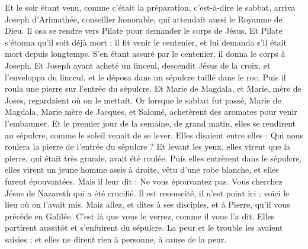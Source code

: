 \begin{multicols}{2}
Et le soir étant venu, comme c'était la préparation, c'est-à-dire le sabbat,
arriva Joseph d'Arimathée, conseiller honorable, qui attendait aussi le Royaume de Dieu. Il osa se rendre vers Pilate pour demander le corps de Jésus.
Et Pilate s'étonna qu'il soit déjà mort ; il fit venir le centenier, et lui demanda s'il était mort depuis longtemps.
S'en étant assuré par le centenier, il donna le corps à Joseph.
Et Joseph ayant acheté un linceul, descendit Jésus de la croix, et l'enveloppa du linceul, et le déposa dans un sépulcre taillé dans le roc. Puis il roula une pierre sur l'entrée du sépulcre.
Et Marie de Magdala, et Marie, mère de Joses, regardaient où on le mettait.
\VerseOne{}Or lorsque le sabbat fut passé, Marie de Magdala, Marie mère de Jacques, et Salomé, achetèrent des aromates pour venir l'embaumer.
Et le premier jour de la semaine, de grand matin, elles se rendirent au sépulcre, comme le soleil venait de se lever.
Elles disaient entre elles : Qui nous roulera la pierre de l'entrée du sépulcre ?
Et levant les yeux, elles virent que la pierre, qui était très grande, avait été roulée.
Puis elles entrèrent dans le sépulcre, elles virent un jeune homme assis à droite, vêtu d'une robe blanche, et elles furent épouvantées.
Mais il leur dit : Ne vous épouvantez pas. Vous cherchez Jésus de Nazareth qui a été crucifié. Il est ressuscité, il n'est point ici ; voici le lieu où on l'avait mis.
Mais allez, et dites à ses disciples, et à Pierre, qu'il vous précède en Galilée. C'est là que vous le verrez, comme il vous l'a dit.
Elles partirent aussitôt et s'enfuirent du sépulcre. La peur et le trouble les avaient saisies ; et elles ne dirent rien à personne, à cause de la peur.

\end{multicols}
